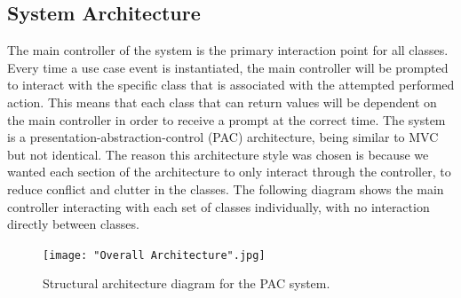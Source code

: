 \documentclass[12pt, titlepage]{article}
\begin{document}
\subsection{System Architecture}
\label{sub:system_architecture}
The main controller of the system is the primary interaction point for all classes. Every time a use case event is instantiated, the main controller will be prompted to interact with the specific class that is associated with the attempted performed action. This means that each class that can return values will be dependent on the main controller in order to receive a prompt at the correct time. The system is a presentation-abstraction-control (PAC) architecture, being similar to MVC but not identical. The reason this architecture style was chosen is because we wanted each section of the architecture to only interact through the controller, to reduce conflict and clutter in the classes. The following diagram shows the main controller interacting with each set of classes individually, with no interaction directly between classes.

\begin{figure}[h!]
  \centering
  \texttt{[image: "Overall Architecture".jpg]}
  \caption{Structural architecture diagram for the PAC system.}
\end{figure}
\end{document}
